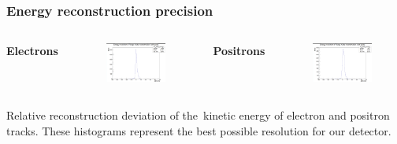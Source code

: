 \documentclass{beamer}
\begin{document}
	\begin{frame}
		\frametitle{Energy reconstruction precision}
		\centering
		\begin{columns}
			\centering
			\Large \textbf{Electrons}
			\begin{figure}
				\centering
				\includegraphics[width = 0.95 \linewidth]{../images/c_e_delta_energy.png}
			\end{figure}
			\centering
			\Large \textbf{Positrons}
			\begin{figure}
				\centering
				\includegraphics[width = 0.95 \linewidth]{../images/c_p_delta_energy.png}
			\end{figure}
		\end{columns}
		\vspace{0.5cm}
		\footnotesize{Relative reconstruction deviation of the~kinetic energy of electron and positron tracks. These histograms represent the best possible resolution for our detector.}
	\end{frame}
	
\end{document}
